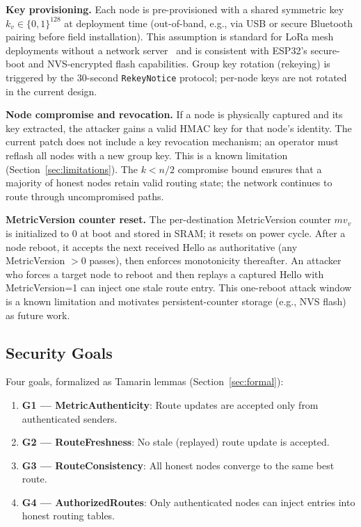 \documentclass[10pt,journal,compsoc]{IEEEtran}
\begin{document}
\textbf{Key provisioning.}
Each node is pre-provisioned with a shared symmetric key
$k_v \in \{0,1\}^{128}$ at deployment time (out-of-band, e.g.,
via USB or secure Bluetooth pairing before field installation).
This assumption is standard for LoRa mesh deployments without
a network server~\cite{shelby2026-zero-trust-iot} and is consistent
with ESP32's secure-boot and NVS-encrypted flash capabilities.
Group key rotation (rekeying) is triggered by the
30-second \texttt{RekeyNotice} protocol; per-node keys are not
rotated in the current design.

\textbf{Node compromise and revocation.}
If a node is physically captured and its key extracted,
the attacker gains a valid HMAC key for that node's identity.
The current patch does not include a key revocation mechanism;
an operator must reflash all nodes with a new group key.
This is a known limitation (Section~\ref{sec:limitations}).
The $k < n/2$ compromise bound ensures that a majority of honest
nodes retain valid routing state; the network continues to
route through uncompromised paths.

\textbf{MetricVersion counter reset.}
The per-destination MetricVersion counter $mv_v$ is initialized
to 0 at boot and stored in SRAM; it resets on power cycle.
After a node reboot, it accepts the next received Hello as
authoritative (any MetricVersion $> 0$ passes), then enforces
monotonicity thereafter. An attacker who forces a target node
to reboot and then replays a captured Hello with MetricVersion=1
can inject one stale route entry. This one-reboot attack window
is a known limitation and motivates persistent-counter storage
(e.g., NVS flash) as future work.

\subsection{Security Goals}

Four goals, formalized as Tamarin lemmas (Section~\ref{sec:formal}):

\begin{enumerate}
  \item \textbf{G1 — MetricAuthenticity}: Route updates are accepted
    only from authenticated senders.
  \item \textbf{G2 — RouteFreshness}: No stale (replayed) route
    update is accepted.
  \item \textbf{G3 — RouteConsistency}: All honest nodes converge
    to the same best route.
  \item \textbf{G4 — AuthorizedRoutes}: Only authenticated nodes
    can inject entries into honest routing tables.
\end{enumerate}
\end{document}
